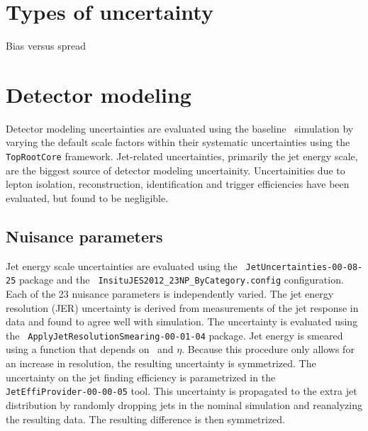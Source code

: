 \section{Types of uncertainty}
Bias versus spread

\section{Detector modeling}
Detector modeling uncertainties are evaluated using the baseline \ttbar\ simulation by varying the
default scale factors within their systematic uncertainties using the \texttt{ TopRootCore} framework. Jet-related uncertainties, primarily the jet energy scale, are the biggest source of detector modeling uncertainity. Uncertainities due to lepton isolation, reconstruction, identification and trigger efficiencies have been evaluated, but found to be negligible. 


\subsection{Nuisance parameters}
\label{ss:np}
Jet energy scale uncertainties are evaluated using the \texttt{ JetUncertainties-00-08-25} package and the 
\texttt{ InsituJES2012\_23NP\_ByCategory.config} configuration.
Each of the 23 nuisance parameters is independently varied.
The jet energy resolution (JER) uncertainty is derived from measurements of the jet response in data and found to agree well with simulation. The uncertainty is evaluated using the \texttt{ ApplyJetResolutionSmearing-00-01-04} package.  Jet energy is smeared using
a function that depends on  \pt\ and $\eta$.    Because this procedure only allows for an increase in resolution, 
the resulting uncertainty is symmetrized.
The uncertainty on the jet finding efficiency is parametrized in the  \texttt{ JetEffiProvider-00-00-05} tool.
This uncertainty is propagated to the extra jet distribution by randomly dropping jets in the nominal simulation
and reanalyzing the resulting data.  The resulting difference is then symmetrized. 


